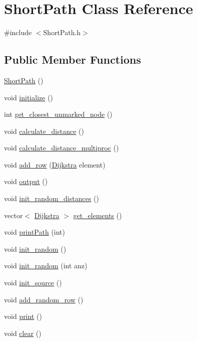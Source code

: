 \hypertarget{class_short_path}{\section{Short\-Path Class Reference}
\label{class_short_path}
}


{\ttfamily \#include $<$Short\-Path.\-h$>$}

\subsection*{Public Member Functions}
\begin{DoxyCompactItemize}
\item 
\hyperlink{class_short_path_aa1f54b3eb632252e0e4f34fed4110d54}{Short\-Path} ()
\item 
void \hyperlink{class_short_path_a113f044a61c1eacafb73df55e12f3803}{initialize} ()
\item 
int \hyperlink{class_short_path_ae218a65d8dd2620afc8c088679c5ab98}{get\-\_\-closest\-\_\-unmarked\-\_\-node} ()
\item 
void \hyperlink{class_short_path_af4ddb3c9a160c273bdc99b3fb43fd58d}{calculate\-\_\-distance} ()
\item 
void \hyperlink{class_short_path_a74f3fa59ffd3e061ef75a7962fbe3cfa}{calculate\-\_\-distance\-\_\-multiproc} ()
\item 
void \hyperlink{class_short_path_af65d23be9601ccf34becf9922c88c263}{add\-\_\-row} (\hyperlink{class_dijkstra}{Dijkstra} element)
\item 
void \hyperlink{class_short_path_aa4ede1b3713f60bef1f23193510199df}{output} ()
\item 
void \hyperlink{class_short_path_a24387db998bac1e88493dc4cf838a68b}{init\-\_\-random\-\_\-distances} ()
\item 
vector$<$ \hyperlink{class_dijkstra}{Dijkstra} $>$ \hyperlink{class_short_path_abf528c510136ea8014abfdd993949a02}{get\-\_\-elements} ()
\item 
void \hyperlink{class_short_path_a363cac67e1c10f524feab977073c35e9}{print\-Path} (int)
\item 
void \hyperlink{class_short_path_af3c6bd7d7b552ca6fa60b89a49db8566}{init\-\_\-random} ()
\item 
void \hyperlink{class_short_path_a1edee840fd8a1deec46d7c8ee4573bae}{init\-\_\-random} (int anz)
\item 
void \hyperlink{class_short_path_a388a3b66967f667a16b16f0f6fb044f3}{init\-\_\-source} ()
\item 
void \hyperlink{class_short_path_afa9098bdffcaaa0d77435dee10a2275f}{add\-\_\-random\-\_\-row} ()
\item 
void \hyperlink{class_short_path_a15edde62ae2c1a9f149815fb846c768e}{print} ()
\item 
void \hyperlink{class_short_path_a1c0cf18c306d022d72393979e37463c8}{clear} ()
\end{DoxyCompactItemize}


